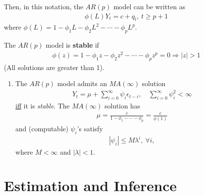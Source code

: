 \documentclass[11pt]{elegantbook}
\begin{document}
Then, in this notation, the $AR(p)$ model can be written as
\begin{equation}
    \begin{aligned}
        \phi(L)Y_t=c+q_t,\ t\geq p+1
    \end{aligned}
    \nonumber
\end{equation}
where $\phi(L)=1-\phi_1 L - \phi_2 L^2 - \cdots - \phi_p L^p$.

\begin{definition}[Stability of $AR(p)$]
    The $AR(p)$ model is \textbf{stable} if \begin{equation}
        \begin{aligned}
            \phi(z)=1-\phi_1 z - \phi_2 z^2 - \cdots - \phi_p z^p=0 \Rightarrow |z|>1
        \end{aligned}
        \nonumber
    \end{equation}
    (All solutions are greater than 1).
\end{definition}

\begin{enumerate}[$\circ$]
    \item The $AR(p)$ model admits an $MA(\infty)$ solution
    \begin{equation}
        \begin{aligned}
            Y_t=\mu+\sum_{i=0}^\infty \psi_i\epsilon_{t-i},\quad \sum_{i=0}^\infty \psi_i^2<\infty
        \end{aligned}
        \nonumber
    \end{equation}
    \underline{iff} it is \textit{stable}.
    The $MA(\infty)$ solution has
    \begin{equation}
        \begin{aligned}
            \mu=\frac{c}{1-\phi_1-\cdots-\phi_p}=\frac{c}{\phi(1)}
        \end{aligned}
        \nonumber
    \end{equation}
    and (computable) $\psi_i$'s satisfy
    \begin{equation}
        \begin{aligned}
            |\psi_i|\leq M \lambda^i,\ \forall i,
        \end{aligned}
        \nonumber
    \end{equation}
    where $M<\infty$ and $|\lambda|<1$.
\end{enumerate}

\chapter{Estimation and Inference}
\end{document}
